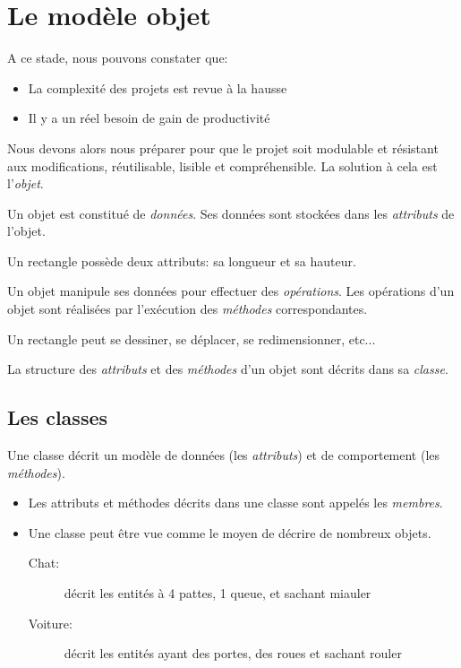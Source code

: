 \chapter{Le modèle objet}

	A ce stade, nous pouvons constater que:
	\begin{itemize}
		\item La complexité des projets est revue à la hausse
		\item Il y a un réel besoin de gain de productivité
	\end{itemize}
	Nous devons alors nous préparer pour que le projet soit modulable et résistant aux modifications, réutilisable, lisible et compréhensible.
	La solution à cela est l'\emph{objet}.
	
	\begin{definition}
		Un objet est constitué de \emph{données}. Ses données sont stockées dans les \emph{attributs} de l'objet.
	\end{definition}

	\begin{exemple}
		Un rectangle possède deux attributs: sa longueur et sa hauteur.
	\end{exemple}

	\begin{definition}
		Un objet manipule ses données pour effectuer des \emph{opérations}. Les opérations d'un objet sont réalisées par l'exécution des \emph{méthodes} correspondantes.
	\end{definition}

	\begin{exemple}
		Un rectangle peut se dessiner, se déplacer, se redimensionner, etc...
	\end{exemple}

	\begin{definition}[Classe]
		La structure des \emph{attributs} et des \emph{méthodes} d'un objet sont décrits dans sa \emph{classe}.
	\end{definition}
	
	
	\section{Les classes}
	
		Une classe décrit un modèle de données (les \emph{attributs}) et de comportement (les \emph{méthodes}).
		\begin{itemize}
			\item Les attributs et méthodes décrits dans une classe sont appelés les \emph{membres}.
			\item Une classe peut être vue comme le moyen de décrire de nombreux objets.
			\begin{description}
				\item[Chat:] décrit les entités à 4 pattes, 1 queue, et sachant miauler
				\item[Voiture:] décrit les entités ayant des portes, des roues et sachant rouler
			\end{description}
		\end{itemize}
	
